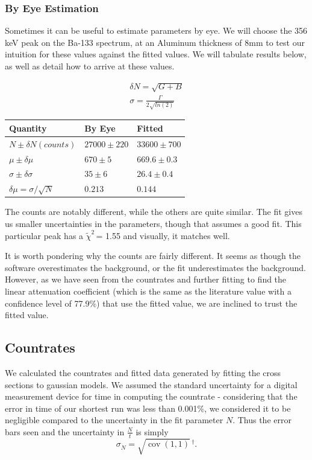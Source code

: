 \documentclass{article}
\newcommand{\redchi}{$\tilde{\chi}^2\,$}
\DeclareMathOperator\cov{cov}
\begin{document}
		\subsubsection{By Eye Estimation}
			Sometimes it can be useful to estimate parameters by eye.  We will choose the 356 keV peak on the Ba-133 spectrum, at an Aluminum thickness of 8mm to test our intuition for these values against the fitted values.  We will tabulate results below, as well as detail how to arrive at these values.

			\begin{gather*}
				\delta N = \sqrt{G + B}\\
				\sigma = \frac{\Gamma}{2\sqrt{ln(2)}}
			\end{gather*}

			\begin{center}
			\begin{tabular}{|l|l|l|}
				\hline
				Quantity & By Eye & Fitted\\ \hline \hline
				$N \pm \delta N (counts)$ & $27000 \pm 220$ & $33600 \pm 700$\\
				$\mu \pm \delta \mu$ & $670 \pm 5$ & $669.6 \pm 0.3$\\ 
				$\sigma \pm \delta \sigma$ & $35 \pm 6$ & $26.4 \pm 0.4$\\
				$\delta \mu  = \sigma/\sqrt{N}$ & $0.213$ & $0.144$\\
				\hline
			\end{tabular}
			\end{center}
			\begin{flushleft}
			The counts are notably different, while the others are quite similar.  The fit gives us smaller uncertainties in the parameters, though that assumes a good fit.  This particular peak has a \redchi = 1.55 and visually, it matches well.

			\vspace{.25cm}

			It is worth pondering why the counts are fairly different.  It seems as though the software overestimates the background, or the fit underestimates the background.  However, as we have seen from the countrates and further fitting to find the linear attenuation coefficient (which is the same as the literature value with a confidence level of 77.9\%) that use the fitted value, we are inclined to trust the fitted value.
			\end{flushleft}

	\subsection{Countrates}
	We calculated the countrates and fitted data generated by fitting the cross sections to gaussian models.  We assumed the standard uncertainty for a digital measurement device for time in computing the countrate - considering that the error in time of our shortest run was less than 0.001\%, we considered it to be negligible compared to the uncertainty in the fit parameter $N$.  Thus the error bars seen and the uncertainty in $\frac{N}{t}$ is simply
	\begin{equation}
		\sigma_{\dot{N}} = \sqrt{\cov(1,1)} \, ^{\dagger}.
	\end{equation}
\end{document}
